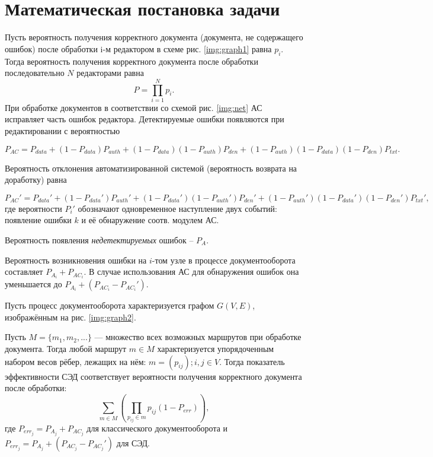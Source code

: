 \section{Математическая постановка задачи} \label{math}

Пусть вероятность получения корректного документа (документа, не содержащего ошибок) после обработки i-м редактором в схеме рис. \ref{img:graph1} равна $p_i$. Тогда вероятность получения корректного документа после обработки последовательно $N$ редакторами равна
$$
P=\prod_{i=1}^N p_i.
$$
При обработке документов в соответствии со схемой рис. \ref{img:net} АС исправляет часть ошибок редактора. Детектируемые ошибки появляются при редактировании с вероятностью

\begin{equation}
  \label{eq:equation3}
P_{AC}=P_{data}+(1-P_{data})P_{auth}+(1-P_{data})(1-P_{auth})P_{den}+(1-P_{auth})(1-P_{data})(1-P_{den})P_{txt}.
\end{equation}

Вероятность отклонения автоматизированной системой (вероятность возврата на доработку) равна

\begin{equation}
  \label{eq:equation4}
P_{AC}'=P_{data}'+(1-P_{data}')P_{auth}'+(1-P_{data}')(1-P_{auth}')P_{den}'+(1-P_{auth}')(1-P_{data}')(1-P_{den}')P_{txt}',
\end{equation}
где вероятности $P_i'$ обозначают одновременное наступление двух событий: появление ошибки $k$ и её обнаружение соотв. модулем АС.

\vspace{\baselineskip}
Вероятность появления \textit{недетектируемых} ошибок -- $P_A$.

\vspace{\baselineskip}
Вероятность возникновения ошибки на $i$-том узле в процессе документооборота составляет $P_{A_i}+P_{{AC}_i}$. В случае использования АС для обнаружения ошибок она уменьшается до $P_{A_i}+(P_{{AC}_i}-P_{{AC}_i}')$.

\vspace{\baselineskip}
Пусть процесс документооборота характеризуется графом $G(V,E)$, изображённым на рис. \ref{img:graph2}.

\vspace{\baselineskip}
Пусть $M = \{m_1, m_2, ... \}$ — множество всех возможных маршрутов при обработке документа. Тогда любой маршрут $m \in M$ характеризуется упорядоченным набором весов рёбер, лежащих на нём: $m=(p_{ij}); i,j \in V$. Тогда показатель эффективности СЭД соответствует вероятности получения корректного документа после обработки:
$$
\sum_{m \in M} (\prod_{p_{ij} \in m} p_{ij}(1-P_{err})),
$$
где $P_{{err}_j}=P_{A_j}+P_{{AC}_j}$ для классического документооборота и $P_{{err}_j}=P_{A_j}+(P_{{AC}_j}-P_{{AC}_j}')$ для СЭД.

